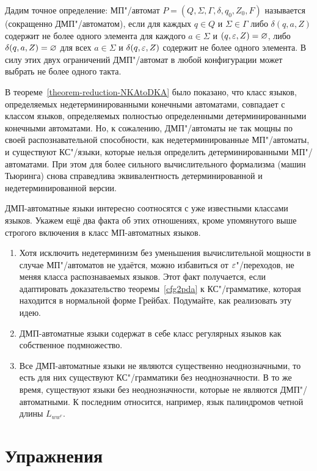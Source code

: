 Дадим точное определение: МП"/автомат $P=(Q,\Sigma,\Gamma,\delta,q_0,Z_0,F)$ называется  (сокращенно ДМП"/автоматом), если для каждых $q\in Q$ и $\Sigma\in\Gamma$ либо $\delta(q,a,Z)$ содержит не более одного элемента для каждого $a\in\Sigma$ и $(q,\varepsilon,Z)=\varnothing$, либо $\delta(q,a,Z)=\varnothing$ для всех $a\in\Sigma$ и $\delta(q,\varepsilon,Z)$ содержит не более одного элемента. В силу этих двух ограничений ДМП"/автомат в любой конфигурации может выбрать не более одного такта.

В теореме~\ref{theorem-reduction-NKAtoDKA} было показано, что класс языков, определяемых недетерминированными конечными автоматами, совпадает с классом языков, определяемых полностью определенными детерминированными конечными автоматами. Но, к сожалению, ДМП"/автоматы не так мощны по своей распознавательной способности, как недетерминированные МП"/автоматы, и существуют КС"/языки, которые нельзя определить детерминированными МП"/автоматами. При этом для более сильного
вычислительного формализма (машин Тьюринга) снова справедлива эквивалентность
детерминированной и недетерминированной версии.

ДМП-автоматные языки интересно соотносятся с уже известными классами языков.
Укажем ещё два факта об этих отношениях, кроме упомянутого выше строгого включения
в класс МП-автоматных языков.
\begin{enumerate}
    \item Хотя исключить недетерминизм без уменьшения вычислительной мощности в случае МП"/автоматов не удаётся, можно избавиться от $\varepsilon$"/переходов,
    не меняя класса распознаваемых языков. Этот факт получается,
   если адаптировать доказательство теоремы~\ref{cfg2pda} к КС"/грамматике,
   которая находится в нормальной форме Грейбах. Подумайте, как
   реализовать эту идею.

    \item ДМП-автоматные языки содержат в себе класс регулярных языков как собственное подмножество.

    \item Все ДМП-автоматные языки не являются существенно неоднозначными, то есть для
    них существуют КС"/грамматики без неоднозначности. В то же время,
    существуют языки без неоднозначности, которые не являются ДМП"/автоматными.
     К последним относится, например, язык палиндромов четной длины
     $L_{ww^r}$.
\end{enumerate}

\section{Упражнения}
\label{Chapter8Exs}

